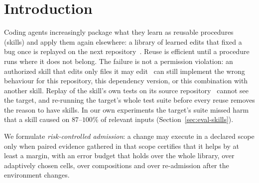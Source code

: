 \section{Introduction}
\label{sec:intro}
Coding agents increasingly package what they learn as reusable procedures (skills) and apply them again elsewhere: a library of
learned edits that fixed a bug once is replayed on the next repository~\cite{wang2024voyager,yang2026gse}.  Reuse is efficient
until a procedure runs where it does not belong.  The failure is not a permission violation: an authorized skill that edits only
files it may edit~\cite{metere2026formal} can still implement the wrong behaviour for this repository, this dependency version, or
this combination with another skill.  Replay of the skill's own tests on its source repository~\cite{yang2026gse} cannot see the
target, and re-running the target's whole test suite before every reuse removes the reason to have skills.  In our own experiments
the target's suite missed harm that a skill caused on $87$--$100\%$ of relevant inputs (Section~\ref{sec:eval-skills}).

We formulate \emph{risk-controlled admission}: a change may execute in a declared scope only when paired evidence gathered in that
scope certifies that it helps by at least a margin, with an error budget that holds over the whole library, over adaptively
chosen cells, over compositions and over re-admission after the environment changes.

